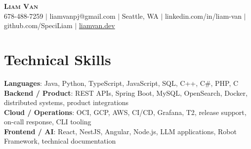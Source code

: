 \documentclass[letterpaper,11pt]{article}
\begin{document}

%
\begin{center}
    \textbf{\Huge \scshape Liam Van} \\ \vspace{1pt}
    \small 678-488-7259 $|$ \small {liamvanpj@gmail.com} $|$ Seattle, WA
 {{$|$ linkedin.com/in/liam-van} {$|$ github.com/SpeciLiam} {$|$ \href{https://liamvan.dev}{liamvan.dev}}}

\end{center}

\section{Technical Skills}
 \begin{itemize}[leftmargin=0.15in, label={}]
    \small{\item{
     \textbf{Languages}{: Java, Python, TypeScript, JavaScript, SQL, C++, C\#, PHP, C} \\
     \textbf{Backend / Product}{: REST APIs, Spring Boot, MySQL, OpenSearch, Docker, distributed systems, product integrations} \\
     \textbf{Cloud / Operations}{: OCI, GCP, AWS, CI/CD, Grafana, T2, release support, on-call response, CLI tooling} \\
     \textbf{Frontend / AI}{: React, NestJS, Angular, Node.js, LLM applications, Robot Framework, technical documentation} \\
    }}
 \end{itemize}
%

\end{document}
